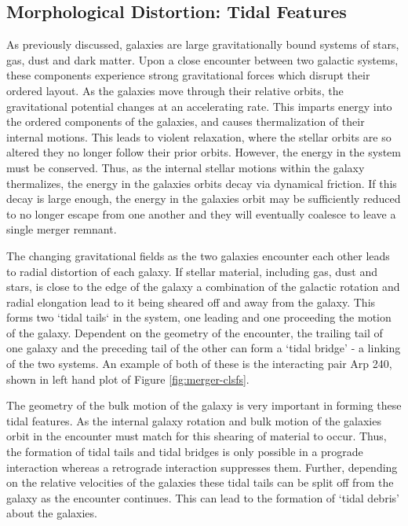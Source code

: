 \subsection{Morphological Distortion: Tidal Features}
\noindent As previously discussed, galaxies are large gravitationally bound systems of stars, gas, dust and dark matter. Upon a close encounter between two galactic systems, these components experience strong gravitational forces which disrupt their ordered layout. As the galaxies move through their relative orbits, the gravitational potential changes at an accelerating rate. This imparts energy into the ordered components of the galaxies, and causes thermalization of their internal motions. This leads to violent relaxation, where the stellar orbits are so altered they no longer follow their prior orbits. However, the energy in the system must be conserved. Thus, as the internal stellar motions within the galaxy thermalizes, the energy in the galaxies orbits decay via dynamical friction. If this decay is large enough, the energy in the galaxies orbit may be sufficiently reduced to no longer escape from one another and they will eventually coalesce to leave a single merger remnant. 

The changing gravitational fields as the two galaxies encounter each other leads to radial distortion of each galaxy. If stellar material, including gas, dust and stars, is close to the edge of the galaxy a combination of the galactic rotation and radial elongation lead to it being sheared off and away from the galaxy. This forms two `tidal tails` in the system, one leading and one proceeding the motion of the galaxy. Dependent on the geometry of the encounter, the trailing tail of one galaxy and the preceding tail of the other can form a `tidal bridge' - a linking of the two systems. An example of both of these is the interacting pair Arp 240, shown in left hand plot of Figure \ref{fig:merger-clsfs}. 

The geometry of the bulk motion of the galaxy is very important in forming these tidal features. As the internal galaxy rotation and bulk motion of the galaxies orbit in the encounter must match for this shearing of material to occur. Thus, the formation of tidal tails and tidal bridges is only possible in a prograde interaction whereas a retrograde interaction suppresses them. Further, depending on the relative velocities of the galaxies these tidal tails can be split off from the galaxy as the encounter continues. This can lead to the formation of `tidal debris' about the galaxies.

